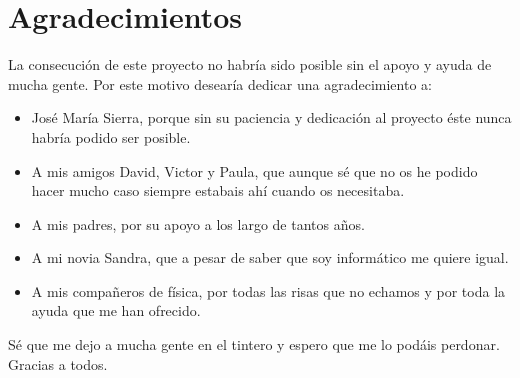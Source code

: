 \chapter{Agradecimientos} 

La consecución de este proyecto no habría sido posible sin el apoyo y ayuda de mucha gente. Por este motivo desearía dedicar una agradecimiento a:

\begin{itemize}

	\item José María Sierra, porque sin su paciencia y dedicación al proyecto éste nunca habría podido ser posible.
	
	\item A mis amigos David, Victor y Paula, que aunque sé que no os he podido hacer mucho caso siempre estabais ahí cuando os necesitaba.
	
	\item A mis padres, por su apoyo a los largo de tantos años.
	
	\item A mi novia Sandra, que a pesar de saber que soy informático me quiere igual.
	
	\item A mis compañeros de física, por todas las risas que no echamos y por toda la ayuda que me han ofrecido.

\end{itemize}

Sé que me dejo a mucha gente en el tintero y espero que me lo podáis perdonar. Gracias a todos.